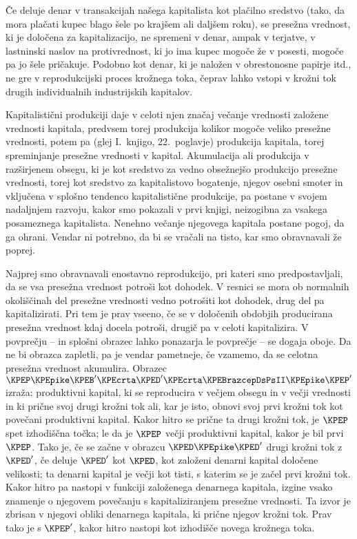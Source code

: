 \documentclass[kapital_02.tex]{subfiles}
\begin{document}
Če deluje denar v transakcijah našega kapitalista kot plačilno sredstvo (tako, da mora plačati kupec blago šele po krajšem ali daljšem roku), se presežna vrednost, ki je določena za kapitalizacijo, ne spremeni v denar, ampak v terjatve, v lastninski naslov na protivrednost, ki jo ima kupec mogoče že v posesti, mogoče pa jo šele pričakuje. Podobno kot denar, ki je naložen v obrestonosne papirje itd., ne gre v reprodukcijski proces krožnega toka, čeprav lahko vstopi v krožni tok drugih individualnih industrijskih kapitalov.

Kapitalistični \KPEstran produkciji daje v celoti njen značaj večanje vrednosti založene vrednosti kapitala, predvsem torej produkcija kolikor mogoče veliko presežne vrednosti, potem pa (glej I.\ knjigo, 22.\ poglavje) produkcija kapitala, torej spreminjanje presežne vrednosti v kapital. Akumulacija ali produkcija v razširjenem obsegu, ki je kot sredstvo za vedno obsežnejšo produkcijo presežne vrednosti, torej kot sredstvo za kapitalistovo bogatenje, njegov osebni smoter in vključena v splošno tendenco kapitalistične produkcije, pa postane v svojem nadaljnjem razvoju, kakor smo pokazali v prvi knjigi, neizogibna za vsakega posameznega kapitalista. Nenehno večanje njegovega kapitala postane pogoj, da ga ohrani. Vendar ni potrebno, da bi se vračali na tisto, kar smo obravnavali že poprej.

Najprej smo obravnavali enostavno reprodukcijo, pri kateri smo predpostavljali, da se vsa presežna vrednost potroši kot dohodek. V resnici se mora ob normalnih okoliščinah del presežne vrednosti vedno potrošiti kot dohodek, drug del pa kapitalizirati. Pri tem je prav vseeno, če se v določenih obdobjih producirana presežna vrednost kdaj docela potroši, drugič pa v celoti kapitalizira. V povprečju -- in splošni obrazec lahko ponazarja le povprečje -- se dogaja oboje. Da ne bi obrazca zapletli, pa je vendar pametneje, če vzamemo, da se celotna presežna vrednost akumulira. Obrazec \( \KPEP \KPEpike \KPEB' \KPEcrta \KPED' \KPEcrta \KPEBrazcepDsPsII \KPEpike \KPEP' \) izraža: produktivni kapital, ki se reproducira v večjem obsegu in v večji vrednosti in ki prične svoj drugi krožni tok ali, kar je isto, obnovi svoj prvi krožni tok kot povečani produktivni kapital. Kakor hitro se prične ta drugi krožni tok, je \( \KPEP \) spet izhodiščna točka; le da je \( \KPEP \) večji produktivni kapital, kakor je bil prvi \( \KPEP \). Tako je, če se začne v obrazcu \( \KPED \KPEpike \KPED' \) drugi krožni tok z \( \KPED' \), če deluje \( \KPED' \) kot \( \KPED \), kot založeni denarni kapital določene velikosti; ta denarni kapital je večji kot tisti, s katerim se je začel prvi krožni tok. Kakor hitro pa nastopi v funkciji založenega denarnega kapitala, izgine vsako znamenje o njegovem povečanju s kapitaliziranjem presežne vrednosti. Ta izvor je zbrisan v njegovi obliki denarnega \KPEstran kapitala, ki prične njegov krožni tok. Prav tako je s \( \KPEP' \), kakor hitro nastopi kot izhodišče novega krožnega toka.
\end{document}
